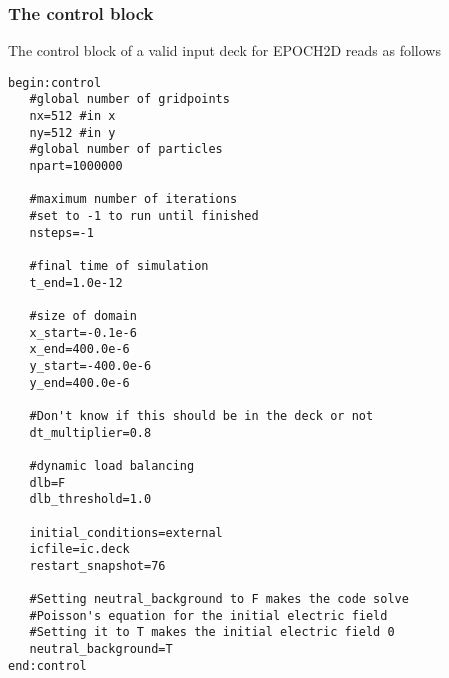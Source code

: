 \documentclass[12pt,a4paper]{article}
\newcommand{\simpleboxverbatim}{\begin{Verbatim}[obeytabs=true,frame=single,
  framerule=0.5mm,rulecolor=\color{warwickmid},formatcom=\color{black}]}
\begin{document}
\subsubsection{The control block}
The control block of a valid input deck for EPOCH2D reads as follows\\
\simpleboxverbatim
begin:control
   #global number of gridpoints
   nx=512 #in x
   ny=512 #in y
   #global number of particles
   npart=1000000

   #maximum number of iterations
   #set to -1 to run until finished
   nsteps=-1

   #final time of simulation
   t_end=1.0e-12

   #size of domain
   x_start=-0.1e-6
   x_end=400.0e-6
   y_start=-400.0e-6
   y_end=400.0e-6

   #Don't know if this should be in the deck or not
   dt_multiplier=0.8

   #dynamic load balancing
   dlb=F
   dlb_threshold=1.0

   initial_conditions=external
   icfile=ic.deck
   restart_snapshot=76

   #Setting neutral_background to F makes the code solve
   #Poisson's equation for the initial electric field
   #Setting it to T makes the initial electric field 0
   neutral_background=T
end:control
\end{Verbatim}
\end{document}
